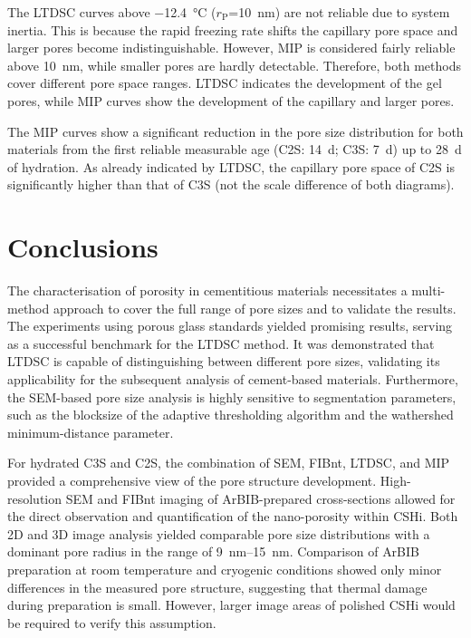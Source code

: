 The \ac{LTDSC} curves above \qty{-12.4}{\celsius} ($r_\text{P}$=\qty{10}{\nano\meter}) are not reliable due to system inertia.
This is because the rapid freezing rate shifts the capillary pore space and larger pores become indistinguishable.
However, \ac{MIP} is considered fairly reliable above \qty{10}{\nano\meter}, while smaller pores are hardly detectable.
Therefore, both methods cover different pore space ranges.
\ac{LTDSC} indicates the development of the gel pores, while \ac{MIP} curves show the development of the capillary and larger pores.

The \ac{MIP} curves show a significant reduction in the pore size distribution for both materials from the first reliable measurable age (\ac{C2S}: \qty{14}{\day}; \ac{C3S}: \qty{7}{\day}) up to \qty{28}{\day} of hydration.
As already indicated by \ac{LTDSC}, the capillary pore space of \ac{C2S} is significantly higher than that of \ac{C3S} (not the scale difference of both diagrams).

\FloatBarrier
\section{Conclusions}

The characterisation of porosity in cementitious materials necessitates a multi-method approach to cover the full range of pore sizes and to validate the results.
The experiments using porous glass standards yielded promising results, serving as a successful benchmark for the \ac{LTDSC} method.
It was demonstrated that \ac{LTDSC} is capable of distinguishing between different pore sizes, validating its applicability for the subsequent analysis of cement-based materials.
Furthermore, the \ac{SEM}-based pore size analysis is highly sensitive to segmentation parameters, such as the blocksize of the adaptive thresholding algorithm and the wathershed minimum-distance parameter.
 
For hydrated \ac{C3S} and \ac{C2S}, the combination of \ac{SEM}, \ac{FIBnt}, \ac{LTDSC}, and \ac{MIP} provided a comprehensive view of the pore structure development.
High-resolution \ac{SEM} and \ac{FIBnt} imaging of \ac{ArBIB}-prepared cross-sections allowed for the direct observation and quantification of the nano-porosity within \ac{CSHi}.
Both 2D and 3D image analysis yielded comparable pore size distributions with a dominant pore radius in the range of \qtyrange{9}{15}{\nano\meter}.
Comparison of \ac{ArBIB} preparation at room temperature and cryogenic conditions showed only minor differences in the measured pore structure, suggesting that thermal damage during preparation is small.
However, larger image areas of polished \ac*{CSHi} would be required to verify this assumption.

